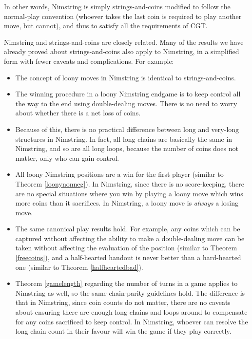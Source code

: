 \documentclass[a4paper,twocolumn]{article}
\begin{document}
In other words, Nimstring is simply strings-and-coins modified to
follow the normal-play convention (whoever takes the last coin is required
to play another move, but cannot), and thus to satisfy all the requirements
of CGT.

Nimstring and strings-and-coins are closely related. Many of the results
we have already proved about strings-and-coins also apply to Nimstring,
in a simplified form with fewer caveats and complications. For example:

\begin{itemize}
  \item The concept of loony moves in Nimstring is identical to
    strings-and-coins.
  \item The winning procedure in a loony Nimstring endgame is to keep
    control all the way to the end using double-dealing moves. There is
    no need to worry about whether there is a net loss of coins.
  \item Because of this, there is no practical difference between long
    and very-long structures in Nimstring. In fact, all long chains are
    basically the same in Nimstring, and so are all long loops, because the
    number of coins does not matter, only who can gain control.
  \item All loony Nimstring positions are a win for the first player
    (similar to Theorem \ref{loonynonneg}). In Nimstring, since there
    is no score-keeping, there are no special situations where you win
    by playing a loony move which wins more coins than it sacrifices.
    In Nimstring, a loony move is \emph{always} a losing move.
  \item The same canonical play results hold. For example, any coins
    which can be captured without affecting the ability to make a
    double-dealing move can be taken without affecting the evaluation
    of the position (similar to Theorem \ref{freecoins}), and a half-hearted
    handout is never better than a hard-hearted one (similar to Theorem
    \ref{halfheartedbad}).
  \item Theorem \ref{gamelength} regarding the number of turns in a game
    applies to Nimstring as well, so the same chain-parity guidelines hold.
    The difference is that in Nimstring, since coin counts do not matter,
    there are no caveats about ensuring there are enough long chains and loops
    around to compensate for any coins sacrificed to keep control. In
    Nimstring, whoever can resolve the long chain count in their favour
    will win the game if they play correctly.
\end{itemize}
\end{document}

